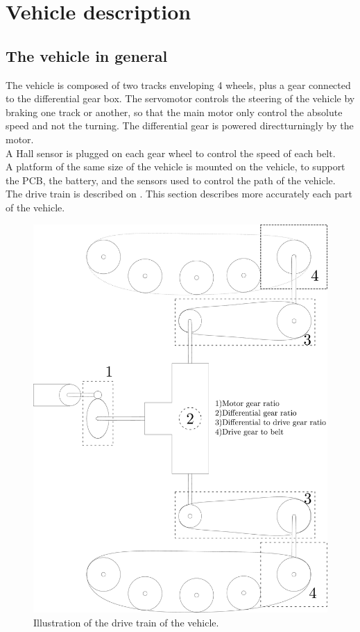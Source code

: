 \section{Vehicle description}

\subsection{The vehicle in general}

The vehicle is composed of two tracks enveloping 4 wheels, plus a gear connected to the differential gear box. The servomotor controls the steering of the vehicle by braking one track or another, so that the main motor only control the absolute speed and not the turning. The differential gear is powered directturningly by the motor.\\
A Hall sensor is plugged on each gear wheel to control the speed of each belt.\\
A platform of the same size of the vehicle  is mounted on the vehicle, to support the PCB, the battery, and the sensors used to control the path of the vehicle.\\

The drive train is described on . This section describes more accurately each part of the vehicle.


\begin{figure}[H]
	\centering
	\includegraphics[scale=0.2]{figures/vehicleDescriptionDriveTrain.pdf}
	\caption{Illustration of the drive train of the vehicle.}
	\label{vehicleDescriptionDriveTrain}
\end{figure}